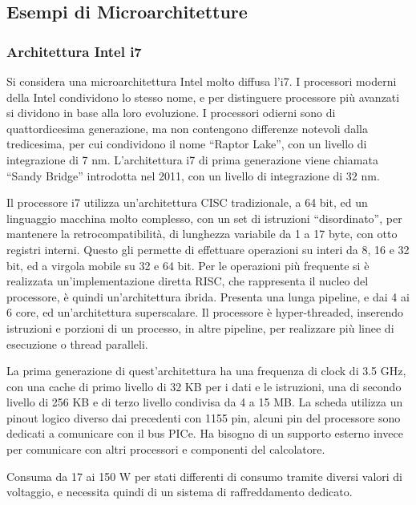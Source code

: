 \documentclass{article}
\numberwithin{equation}{subsection}
\begin{document}
\subsection{Esempi di Microarchitetture}

\subsubsection{Architettura Intel i7}

Si considera una microarchitettura Intel molto diffusa l'i7. I processori moderni della Intel condividono lo stesso nome, e per distinguere processore più avanzati si dividono 
in base alla loro evoluzione. I processori odierni sono di quattordicesima generazione, ma non contengono differenze notevoli dalla tredicesima, per cui condividono il nome 
``Raptor Lake'', con un livello di integrazione di 7 nm. L'architettura i7 di prima generazione viene chiamata ``Sandy Bridge'' introdotta nel 2011, con un livello di 
integrazione di 32 nm. 

Il processore i7 utilizza un'architettura CISC tradizionale, a 64 bit, ed un linguaggio macchina molto complesso, con un set di istruzioni ``disordinato'', per mantenere la 
retrocompatibilità, di lunghezza variabile da 1 a 17 byte, con otto registri interni. Questo gli permette di effettuare operazioni su interi da 8, 16 e 32 bit, ed a virgola mobile su 32 e 64 bit. 
Per le operazioni più frequente si è realizzata un'implementazione diretta RISC, che rappresenta il nucleo del processore, è quindi un'architettura ibrida. Presenta una lunga 
pipeline, e dai 4 ai 6 core, ed un'architettura superscalare. 
Il processore è hyper-threaded, inserendo istruzioni e porzioni di un processo, in altre pipeline, per realizzare più linee di esecuzione o thread paralleli. 

La prima generazione di quest'architettura ha una frequenza di clock di 3.5 GHz, con una cache di primo livello di 32 KB per i dati e le istruzioni, una di secondo livello di 256 KB e di 
terzo livello condivisa da 4 a 15 MB. 
La scheda utilizza un pinout logico diverso dai precedenti con 1155 pin, alcuni pin del processore sono dedicati a comunicare con il bus PICe. Ha bisogno di un supporto esterno invece per comunicare con altri processori e componenti del 
calcolatore. 

Consuma da 17 ai 150 W per stati differenti di consumo tramite diversi valori di voltaggio, e necessita quindi di un sistema di raffreddamento dedicato. 

\end{document}
